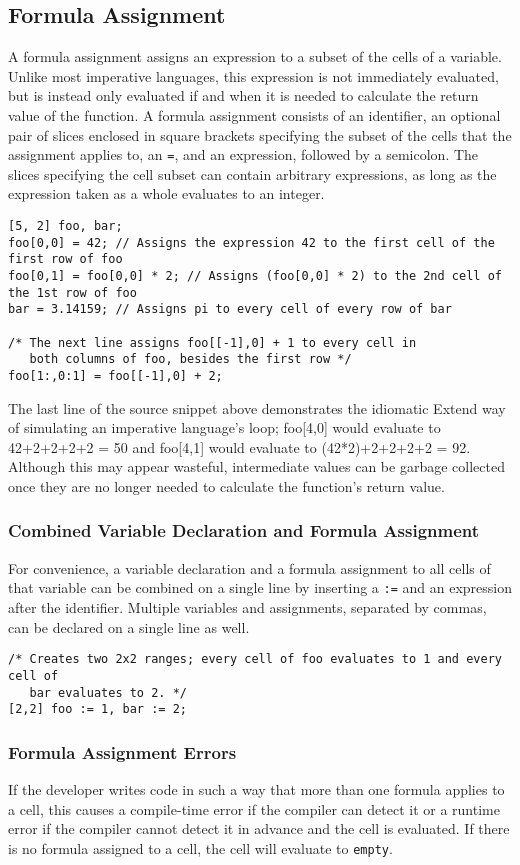 \subsection{Formula Assignment}
\label{sec:formula}
A formula assignment assigns an expression to a subset of the cells of a variable. Unlike most imperative languages, this expression is not immediately evaluated, but is instead only evaluated if and when it is needed to calculate the return value of the function. A formula assignment consists of an identifier, an optional pair of slices enclosed in square brackets specifying the subset of the cells that the assignment applies to, an \texttt{=}, and an expression, followed by a semicolon. The slices specifying the cell subset can contain arbitrary expressions, as long as the expression taken as a whole evaluates to an integer.
\begin{lstlisting}
[5, 2] foo, bar;
foo[0,0] = 42; // Assigns the expression 42 to the first cell of the first row of foo
foo[0,1] = foo[0,0] * 2; // Assigns (foo[0,0] * 2) to the 2nd cell of the 1st row of foo
bar = 3.14159; // Assigns pi to every cell of every row of bar

/* The next line assigns foo[[-1],0] + 1 to every cell in
   both columns of foo, besides the first row */
foo[1:,0:1] = foo[[-1],0] + 2;
\end{lstlisting}
The last line of the source snippet above demonstrates the idiomatic Extend way of simulating an imperative language's loop; foo[4,0] would evaluate to 42+2+2+2+2 = 50 and foo[4,1] would evaluate to (42*2)+2+2+2+2 = 92. Although this may appear wasteful, intermediate values can be garbage collected once they are no longer needed to calculate the function's return value.
\subsubsection{Combined Variable Declaration and Formula Assignment}
For convenience, a variable declaration and a formula assignment to all cells of that variable can be combined on a single line by inserting a \texttt{:=} and an expression after the identifier. Multiple variables and assignments, separated by commas, can be declared on a single line as well.
\begin{lstlisting}
/* Creates two 2x2 ranges; every cell of foo evaluates to 1 and every cell of
   bar evaluates to 2. */
[2,2] foo := 1, bar := 2;
\end{lstlisting}
\subsubsection{Formula Assignment Errors}
If the developer writes code in such a way that more than one formula applies to a cell, this causes a compile-time error if the compiler can detect it or a runtime error if the compiler cannot detect it in advance and the cell is evaluated. If there is no formula assigned to a cell, the cell will evaluate to \texttt{empty}.
